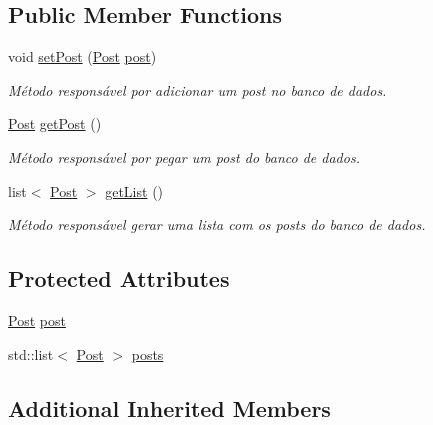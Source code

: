 \subsection*{Public Member Functions}
\begin{DoxyCompactItemize}
\item 
void \hyperlink{class_post_command_a97afc7233ef59c7443dc0b8dc646aa22}{set\-Post} (\hyperlink{class_post}{Post} \hyperlink{class_post_command_a742316428e6f664b6f81334febfe3bf2}{post})
\begin{DoxyCompactList}\small\item\em Método responsável por adicionar um post no banco de dados. \end{DoxyCompactList}\item 
\hypertarget{class_post_command_a681bd3f3bcc13742174dfd3cea6211ba}{\hyperlink{class_post}{Post} \hyperlink{class_post_command_a681bd3f3bcc13742174dfd3cea6211ba}{get\-Post} ()}\label{class_post_command_a681bd3f3bcc13742174dfd3cea6211ba}

\begin{DoxyCompactList}\small\item\em Método responsável por pegar um post do banco de dados. \end{DoxyCompactList}\item 
\hypertarget{class_post_command_adf6424f7cc08823acfb61a6a16094de9}{list$<$ \hyperlink{class_post}{Post} $>$ \hyperlink{class_post_command_adf6424f7cc08823acfb61a6a16094de9}{get\-List} ()}\label{class_post_command_adf6424f7cc08823acfb61a6a16094de9}

\begin{DoxyCompactList}\small\item\em Método responsável gerar uma lista com os posts do banco de dados. \end{DoxyCompactList}\end{DoxyCompactItemize}
\subsection*{Protected Attributes}
\begin{DoxyCompactItemize}
\item 
\hyperlink{class_post}{Post} \hyperlink{class_post_command_a742316428e6f664b6f81334febfe3bf2}{post}
\item 
std\-::list$<$ \hyperlink{class_post}{Post} $>$ \hyperlink{class_post_command_ad6f46406bfc537c8cd5250fe82fc1a0a}{posts}
\end{DoxyCompactItemize}
\subsection*{Additional Inherited Members}


